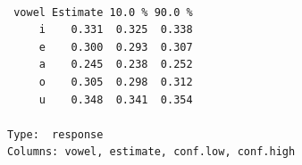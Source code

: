 \documentclass[
  authoryear,
  preprint,
  3p]{elsarticle}
\begin{document}
\begin{verbatim}

 vowel Estimate 10.0 % 90.0 %
     i    0.331  0.325  0.338
     e    0.300  0.293  0.307
     a    0.245  0.238  0.252
     o    0.305  0.298  0.312
     u    0.348  0.341  0.354

Type:  response 
Columns: vowel, estimate, conf.low, conf.high 
\end{verbatim}


\renewcommand\refname{Case study 2: pre-nasalisation in Greek}
  
\end{document}
